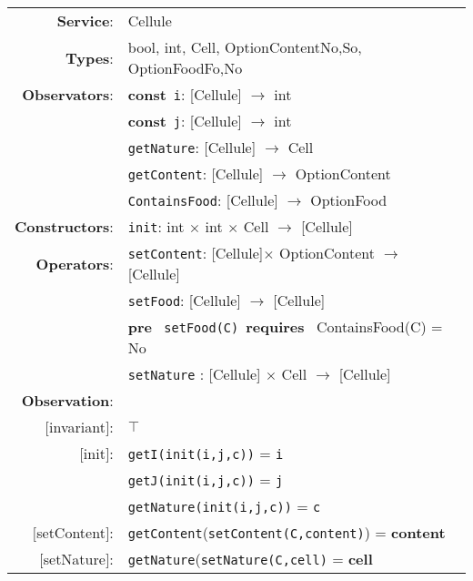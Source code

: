 \documentclass{article}
\begin{document}
\begin{tabular}{rl}
\textbf{Service}: & \textrm{Cellule}  \\
\textbf{Types}: & \textrm{bool}, \textrm{int}, \textrm{Cell}, OptionContent{No,So}, OptionFood{Fo,No}  \\
\textbf{Observators}: & \textbf{const}~\texttt{i}: \textrm{[Cellule]} $\rightarrow$ \textrm{int} \\
& \textbf{const}~\texttt{j}: \textrm{[Cellule]} $\rightarrow$ \textrm{int} \\
& \texttt{getNature}: \textrm{[Cellule]} $\rightarrow$ \textrm{Cell} \\
& \texttt{getContent}: \textrm{[Cellule]} $\rightarrow$ \textrm{OptionContent} \\
& \texttt{ContainsFood}:
\textrm{[Cellule]} $\rightarrow$ \textrm{OptionFood} \\

\textbf{Constructors}: & \texttt{init}: \textrm{int} $\times$ \textrm{int} $\times$ \textrm{Cell} $\rightarrow$ \textrm{[Cellule]} \\
\textbf{Operators}: & \texttt{setContent}: \textrm{[Cellule]}$\times$ \textrm{OptionContent} $\rightarrow$ \textrm{[Cellule]} \\
&\texttt{setFood}: \textrm{[Cellule]} $\rightarrow$ \textrm{[Cellule]} \\
& \quad\quad \textbf{pre}~ \texttt{setFood(C)}~\textbf{requires}~ ContainsFood(C) = No\\
& \texttt{setNature} : \textrm{[Cellule]} $\times$ \textrm{Cell} $\rightarrow$ \textrm{[Cellule]} \\  

       \textbf{Observation}: \\
       $[$invariant$]$: & $\top$ \\
       $[$init$]$: & \texttt{getI(init(i,j,c))} = \texttt{i} \\
       & \texttt{getJ(init(i,j,c))} = \texttt{j}\\
       & \texttt{getNature(init(i,j,c))} = \texttt{c}\\ 
       $[$setContent$]$: & \texttt{getContent}(\texttt{setContent(C,content)}) = \textbf{content} \\
$[$setNature$]$: & \texttt{getNature}(\texttt{setNature(C,cell)} = \textbf{cell} \\
\end{tabular}
\end{document}
